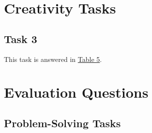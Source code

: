 \documentclass[stu,12pt,floatsintext]{apa7}
\begin{document}
\section{Creativity Tasks}

\subsection{Task 3}

This task is answered in \hyperref[tab:table4]{Table 5}.

\section{Evaluation Questions}

\subsection{Problem-Solving Tasks}
\end{document}
